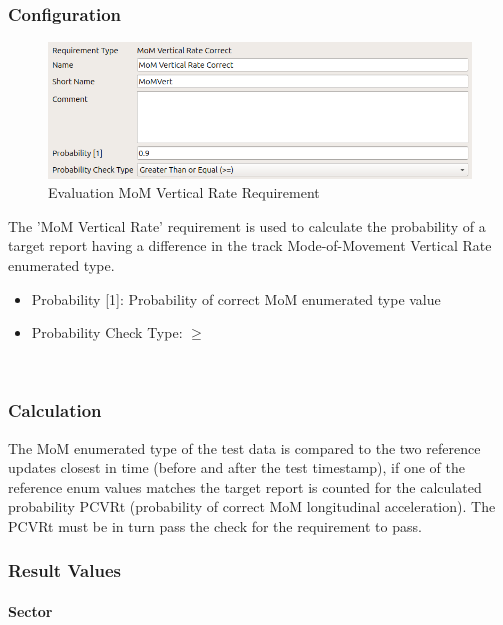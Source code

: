 \subsubsection{Configuration}

\begin{figure}[H]
    \includegraphics[width=14cm,frame]{figures/eval_req_mom_vert.png}
  \caption{Evaluation MoM Vertical Rate Requirement}
\end{figure}

The 'MoM Vertical Rate’ requirement is used to calculate the probability of a target report having a difference in the track Mode-of-Movement Vertical Rate enumerated type. 

\begin{itemize}  
\item Probability [1]: Probability of correct MoM enumerated type value
\item Probability Check Type: $\geq$
\end{itemize}
\ \\


\subsubsection{Calculation}

The MoM enumerated type of the test data is compared to the two reference updates closest in time (before and after the test timestamp), if one of the reference enum values matches the target report is counted for the calculated probability PCVRt (probability of correct MoM longitudinal acceleration). The PCVRt must be in turn pass the check for the requirement to pass. 

\subsubsection{Result Values}

\paragraph{Sector}

